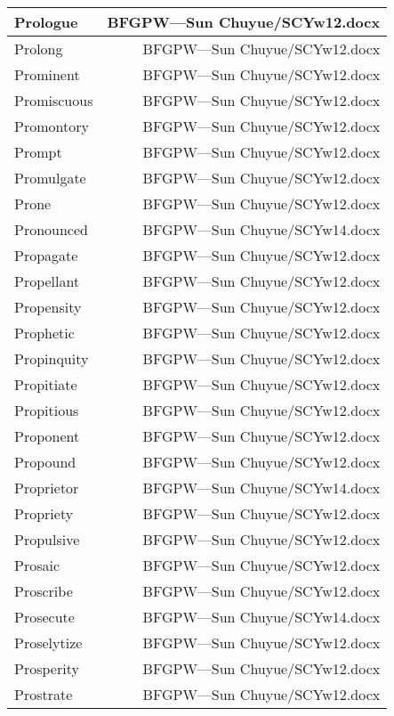 \documentclass{article}
\begin{document}
\begin{center}
\begin{longtable}{|l|r|}
\hline
Prologue  &  BFGPW---Sun Chuyue/SCYw12.docx\\  
\hline
Prolong  &  BFGPW---Sun Chuyue/SCYw12.docx\\  
\hline
Prominent  &  BFGPW---Sun Chuyue/SCYw12.docx\\  
\hline
Promiscuous  &  BFGPW---Sun Chuyue/SCYw12.docx\\  
\hline
Promontory  &  BFGPW---Sun Chuyue/SCYw12.docx\\  
\hline
Prompt  &  BFGPW---Sun Chuyue/SCYw12.docx\\  
\hline
Promulgate  &  BFGPW---Sun Chuyue/SCYw12.docx\\  
\hline
Prone  &  BFGPW---Sun Chuyue/SCYw12.docx\\  
\hline
Pronounced  &  BFGPW---Sun Chuyue/SCYw14.docx\\  
\hline
Propagate  &  BFGPW---Sun Chuyue/SCYw12.docx\\  
\hline
Propellant  &  BFGPW---Sun Chuyue/SCYw12.docx\\  
\hline
Propensity  &  BFGPW---Sun Chuyue/SCYw12.docx\\  
\hline
Prophetic  &  BFGPW---Sun Chuyue/SCYw12.docx\\  
\hline
Propinquity  &  BFGPW---Sun Chuyue/SCYw12.docx\\  
\hline
Propitiate  &  BFGPW---Sun Chuyue/SCYw12.docx\\  
\hline
Propitious  &  BFGPW---Sun Chuyue/SCYw12.docx\\  
\hline
Proponent  &  BFGPW---Sun Chuyue/SCYw12.docx\\  
\hline
Propound  &  BFGPW---Sun Chuyue/SCYw12.docx\\  
\hline
Proprietor  &  BFGPW---Sun Chuyue/SCYw14.docx\\  
\hline
Propriety  &  BFGPW---Sun Chuyue/SCYw12.docx\\  
\hline
Propulsive  &  BFGPW---Sun Chuyue/SCYw12.docx\\  
\hline
Prosaic  &  BFGPW---Sun Chuyue/SCYw12.docx\\  
\hline
Proscribe  &  BFGPW---Sun Chuyue/SCYw12.docx\\  
\hline
Prosecute  &  BFGPW---Sun Chuyue/SCYw14.docx\\  
\hline
Proselytize  &  BFGPW---Sun Chuyue/SCYw12.docx\\  
\hline
Prosperity  &  BFGPW---Sun Chuyue/SCYw12.docx\\  
\hline
Prostrate  &  BFGPW---Sun Chuyue/SCYw12.docx\\  
\hline

\end{longtable}
\end{center}
\end{document}
